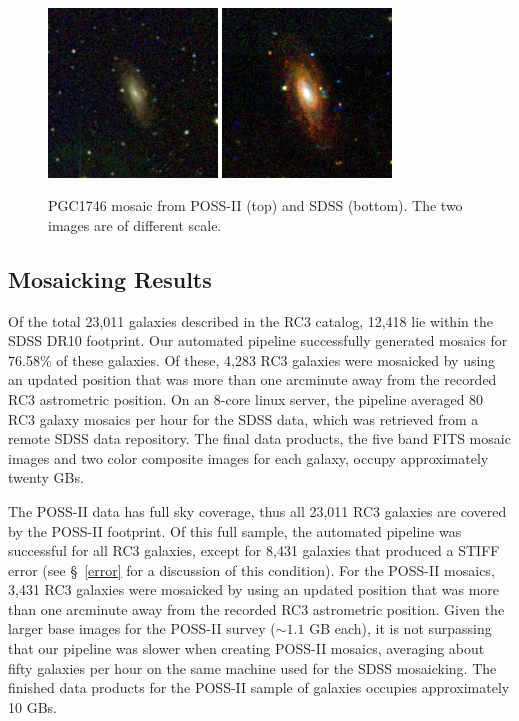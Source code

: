 \documentclass[authoryear, 12pt, 5p, times]{elsarticle}
\begin{document}
\begin{figure}[h]
\centering
\includegraphics[width=0.4\textwidth]{figures/DSS_1154_BEST}	
\includegraphics[width=0.4\textwidth]{figures/SDSS_1154_BEST}
\caption{PGC1746 mosaic from POSS-II (top) and SDSS (bottom). The two images are of different scale.}
\label{sdss_dss_comp}
\end{figure}

\subsection{Mosaicking Results}

Of the total 23,011 galaxies described in the RC3 catalog, 12,418 lie within the SDSS DR10 footprint. Our automated pipeline successfully generated mosaics for 76.58\% of these galaxies. Of these, 4,283 RC3 galaxies were mosaicked by using an updated position that was more than one arcminute away from the recorded RC3 astrometric position. On an 8-core linux server, the pipeline averaged 80 RC3 galaxy mosaics per hour for the SDSS data, which was retrieved from a remote SDSS data repository. The final data products, the five band FITS mosaic images and two color composite images for each galaxy, occupy approximately twenty GBs.

The POSS-II data has full sky coverage, thus all 23,011 RC3 galaxies are covered by the POSS-II footprint. Of this full sample, the automated pipeline was successful for all RC3 galaxies, except for 8,431 galaxies that produced a STIFF error (see \S~\ref{error} for a discussion of this condition). For the POSS-II mosaics, 3,431 RC3 galaxies were mosaicked by using an updated position that was more than one arcminute away from the recorded RC3 astrometric position. Given the larger base images for the POSS-II survey ($\sim1.1$ GB each), it is not surpassing that our pipeline was slower when creating POSS-II mosaics, averaging about fifty galaxies per hour on the same machine used for the SDSS mosaicking. The finished data products for the POSS-II sample of galaxies occupies approximately 10 GBs.
\end{document}
